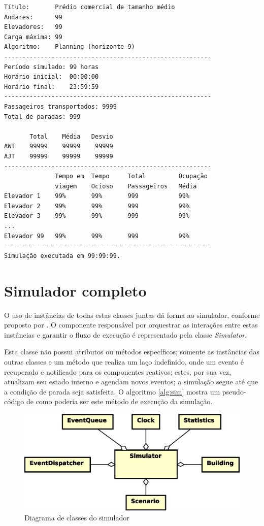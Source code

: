 \begin{lstlisting}
Título:       Prédio comercial de tamanho médio
Andares:      99
Elevadores:   99
Carga máxima: 99
Algoritmo:    Planning (horizonte 9)
---------------------------------------------------------
Período simulado: 99 horas
Horário inicial:  00:00:00
Horário final:    23:59:59
---------------------------------------------------------
Passageiros transportados: 9999
Total de paradas: 999

       Total    Média   Desvio
AWT    99999    99999    99999
AJT    99999    99999    99999
---------------------------------------------------------
              Tempo em  Tempo     Total         Ocupação
              viagem    Ocioso    Passageiros   Média
Elevador 1    99%       99%       999           99%
Elevador 2    99%       99%       999           99%
Elevador 3    99%       99%       999           99%
...
Elevador 99   99%       99%       999           99%
---------------------------------------------------------
Simulação executada em 99:99:99.
\end{lstlisting}

\section{Simulador completo}

O uso de instâncias de todas estas classes juntas dá forma ao simulador,
conforme proposto por \cite{Law,Banks}. O componente responsável por orquestrar
as interações entre estas instâncias e garantir o fluxo de execução é
representado pela classe \textit{Simulator}.

Esta classe não possui atributos ou métodos específicos; somente as instâncias
das outras classes e um método que realiza um laço indefinido, onde um evento é
recuperado e notificado para os componentes reativos; estes, por sua vez,
atualizam seu estado interno e agendam novos eventos; a simulação segue até que
a condição de parada seja satisfeita. O algoritmo \ref{alg:sim} mostra um
pseudo-código de como poderia ser este método de execução da simulação.

\begin{figure}[htb!]
  \centering
  \includegraphics[scale=0.6]{img/Simulator.eps}
  \caption{Diagrama de classes do simulador}
\label{fig:diagram:simulator}
\end{figure}

